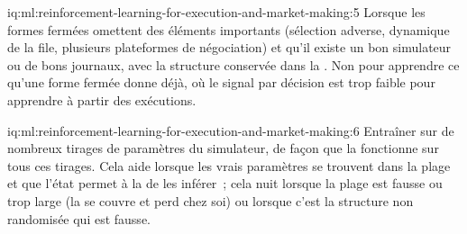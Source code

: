 \begin{solution}{iq:ml:reinforcement-learning-for-execution-and-market-making:5}
Lorsque les formes fermées omettent des éléments importants (sélection adverse, dynamique de la file, plusieurs plateformes de négociation) et qu'il existe un bon simulateur ou de bons journaux,
avec la structure conservée dans la . Non pour apprendre ce qu'une forme fermée donne déjà, où le signal par décision
est trop faible pour apprendre à partir des exécutions.
\end{solution}

\begin{solution}{iq:ml:reinforcement-learning-for-execution-and-market-making:6}
Entraîner sur de nombreux tirages de paramètres du simulateur, de façon que la  fonctionne sur tous ces tirages. Cela aide lorsque les vrais paramètres se trouvent
dans la plage et que l'état permet à la  de les inférer~; cela nuit lorsque la plage est fausse ou trop large (la  se couvre et perd
chez soi) ou lorsque c'est la structure non randomisée qui est fausse.
\end{solution}
